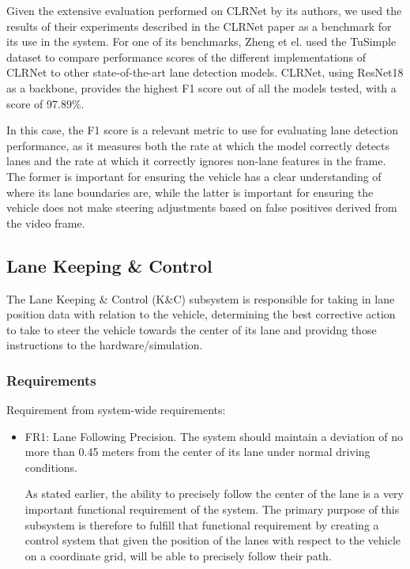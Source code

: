 \documentclass[titlepage,draft]{article}
\begin{document}
{

Given the extensive evaluation performed on CLRNet by its authors, we used the results of their experiments described in
the CLRNet paper \cite{zheng2022clrnet} as a benchmark for its use in the system.
For one of its benchmarks, Zheng et el. used the TuSimple dataset to compare performance scores of the different implementations
of CLRNet to other state-of-the-art lane detection models.
CLRNet, using ResNet18 as a backbone, provides the highest F1 score out of all the models tested, with a score of 97.89\%.

In this case, the F1 score is a relevant metric to use for evaluating lane detection performance, as it measures both
the rate at which the model correctly detects lanes and the rate at which it correctly ignores non-lane features in the frame.
The former is important for ensuring the vehicle has a clear understanding of where its lane boundaries are, while the latter
is important for ensuring the vehicle does not make steering adjustments based on false positives derived from the video frame.

\subsection{Lane Keeping \& Control}
The Lane Keeping \& Control (K\&C) subsystem is responsible for taking in lane position data with relation to the vehicle, determining the best corrective action to take to steer the vehicle towards the center of its lane and providng those instructions to the hardware/simulation.

\subsubsection{Requirements}
Requirement from system-wide requirements:

\begin{itemize}
	\item FR1: Lane Following Precision. The system should maintain a deviation of no more than 0.45 meters from the center of its lane under normal driving conditions.

	      As stated earlier, the ability to precisely follow the center of the lane is a very important functional requirement of the system. The primary purpose of this subsystem is therefore to fulfill that functional requirement by creating a control system that given the position of the lanes with respect to the vehicle on a coordinate grid, will be able to precisely follow their path.


\end{itemize}}
\end{document}
